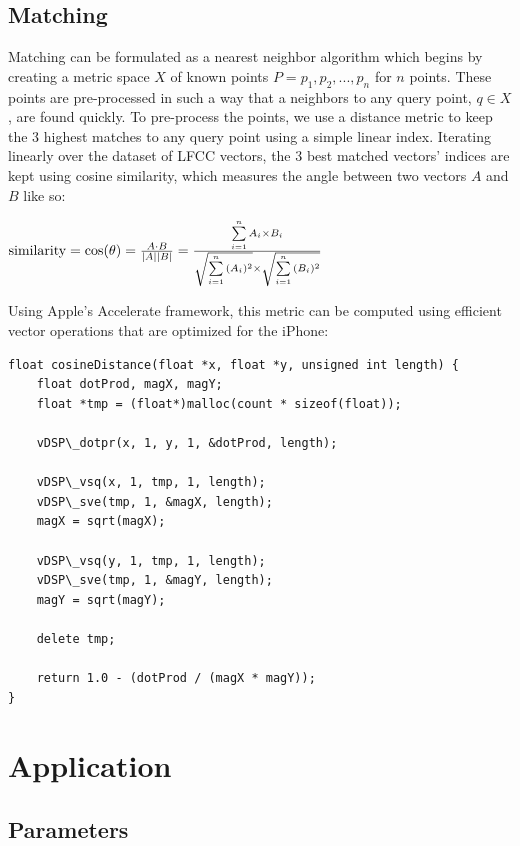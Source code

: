 \documentclass[a4paper,11pt,final]{ThesisStyle}
\begin{document}

\subsection{Matching}

Matching can be formulated as a nearest neighbor algorithm which begins by creating a metric space $X$ of known points $P = p_1, p_2, ..., p_n$ for $n$ points.  These points are pre-processed in such a way that a neighbors to any query point, $q \in X$, are found quickly.  To pre-process the points, we use a distance metric to keep the 3 highest matches to any query point using a simple linear index.  Iterating linearly over the dataset of LFCC vectors, the 3 best matched vectors' indices are kept using cosine similarity, which measures the angle between two vectors $A$ and $B$ like so:

\begin{math}
\textnormal{similarity} = \cos(\theta) = {A \cdot B \over |A| |B|} = \frac{ \sum\limits_{i=1}^{n}{A_i \times B_i} }{ \\ \sqrt{\sum\limits_{i=1}^{n}{(A_i)^2}} \times \sqrt{\sum\limits_{i=1}^{n}{(B_i)^2}}} 
\end{math}

Using Apple's Accelerate framework, this metric can be computed using efficient vector operations that are optimized for the iPhone:
\clearpage
\begin{lstlisting}
float cosineDistance(float *x, float *y, unsigned int length) {
	float dotProd, magX, magY;
	float *tmp = (float*)malloc(count * sizeof(float));
	
	vDSP\_dotpr(x, 1, y, 1, &dotProd, length);
	
	vDSP\_vsq(x, 1, tmp, 1, length);
	vDSP\_sve(tmp, 1, &magX, length);
	magX = sqrt(magX);
	
	vDSP\_vsq(y, 1, tmp, 1, length);
	vDSP\_sve(tmp, 1, &magY, length);
	magY = sqrt(magY);
	
	delete tmp;
	
	return 1.0 - (dotProd / (magX * magY));
}
\end{lstlisting}

\section{Application}

\subsection{Parameters}
\label{subsec:parameters}
\end{document}
